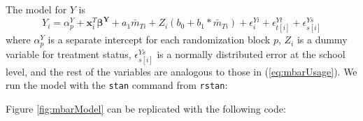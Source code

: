 \documentclass{article}
\begin{document}
The model for $Y$ is
\begin{equation}
Y_i=\alpha^Y_p+\bm{x}_i^T\bm{\beta^Y}+a_1\bar{m}_{Ti}+Z_i(b_0+b_1*\bar{m}_{Ti})+\epsilon^{Yi}_i+\epsilon^{Yt}_{t[i]}+\epsilon^{Ys}_{s[i]}
\end{equation}
where $\alpha^Y_p$ is a separate intercept for each randomization
block $p$, $Z_i$ is a dummy variable for treatment status,
$\epsilon^{Ys}_{s[i]}$ is a normally distributed error at the school
level, and the rest of the variables are analogous to those in
(\ref{eq:mbarUsage}).
We run the model with the \texttt{stan} command from \texttt{rstan}:
\begin{kframe}
\begin{alltt}
 \hlkwb{<-} \hlstd{(}\hlstd{,}\hlstd{=}\hlstd{)}
\end{alltt}
\end{kframe}

Figure \ref{fig:mbarModel} can be replicated with the following code:
\end{document}
